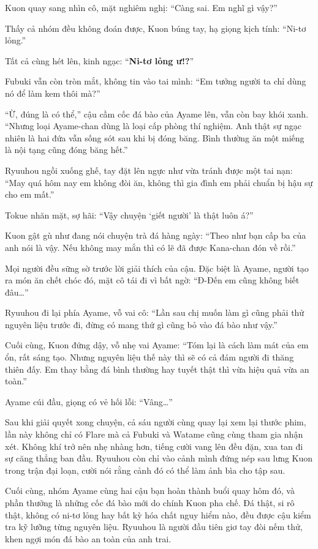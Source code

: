 \documentclass[../main.tex]{subfiles}
\begin{document}
Kuon quay sang nhìn cô, mặt nghiêm nghị: ``Càng sai. Em nghĩ gì vậy?''

Thấy cả nhóm đều không đoán được, Kuon búng tay, hạ giọng kịch tính: ``Ni-tơ lỏng.''

Tất cả cùng hét lên, kinh ngạc: ``\textbf{Ni-tơ lỏng ư!?}''

Fubuki vẫn còn tròn mắt, không tin vào tai mình: ``Em tưởng người ta chỉ dùng nó để làm kem thôi mà?''

``Ừ, đúng là có thể,'' cậu cầm cốc đá bào của Ayame lên, vẫn còn bay khói xanh. ``Nhưng loại Ayame-chan dùng là loại cấp phòng thí nghiệm. Anh thật sự ngạc nhiên là hai đứa vẫn sống sót sau khi bị đóng băng. Bình thường ăn một miếng là nội tạng cũng đóng băng hết.''

Ryuuhou ngồi xuống ghế, tay đặt lên ngực như vừa tránh được một tai nạn: ``May quá hôm nay em không đòi ăn, không thì gia đình em phải chuẩn bị hậu sự cho em mất.''

Tokue nhăn mặt, sợ hãi: ``Vậy chuyện `giết người' là thật luôn á?''

Kuon gật gù như đang nói chuyện trà đá hàng ngày: ``Theo như bạn cấp ba của anh nói là vậy. Nếu không may mắn thì có lẽ đã được Kana-chan đón về rồi.''

Mọi người đều sững sờ trước lời giải thích của cậu. Đặc biệt là Ayame, người tạo ra món ăn chết chóc đó, mặt cô tái đi vì bất ngờ: ``Đ-Đến em cũng không biết đâu\dots''

Ryuuhou đi lại phía Ayame, vỗ vai cô: ``Lần sau chị muốn làm gì cũng phải thử nguyên liệu trước đi, đừng có mang thứ gì cũng bỏ vào đá bào như vậy.''

Cuối cùng, Kuon đứng dậy, vỗ nhẹ vai Ayame: ``Tóm lại là cách làm mát của em ổn, rất sáng tạo. Nhưng nguyên liệu thế này thì sẽ có cả đám người đi thăng thiên đấy. Em thay bằng đá bình thường hay tuyết thật thì vừa hiệu quả vừa an toàn.''

Ayame cúi đầu, giọng có vẻ hối lỗi: ``Vâng\dots''

Sau khi giải quyết xong chuyện, cả sáu người cùng quay lại xem lại thước phim, lần này không chỉ có Flare mà cả Fubuki và Watame cũng cùng tham gia nhận xét. Không khí trở nên nhẹ nhàng hơn, tiếng cười vang lên đều đặn, xua tan đi sự căng thẳng ban đầu. Ryuuhou còn chỉ vào cảnh mình đứng nép sau lưng Kuon trong trận đại loạn, cười nói rằng cảnh đó có thể làm ảnh bìa cho tập sau.

Cuối cùng, nhóm Ayame cùng hai cậu bạn hoàn thành buổi quay hôm đó, và phần thưởng là những cốc đá bào mới do chính Kuon pha chế. Đá thật, si rô thật, không có ni-tơ lỏng hay bất kỳ hóa chất nguy hiểm nào, đều được cậu kiểm tra kỹ lưỡng từng nguyên liệu. Ryuuhou là người đầu tiên giơ tay đòi nếm thử, khen ngợi món đá bào an toàn của anh trai.
\end{document}
